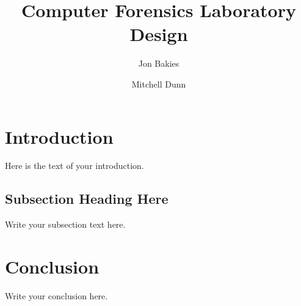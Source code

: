 \documentclass{article}
\begin{document}
\title{Computer Forensics Laboratory Design}
\author{Jon Bakies \and Mitchell Dunn} 

\maketitle
\newpage

\tableofcontents
\newpage

\section{Introduction}
Here is the text of your introduction.

\subsection{Subsection Heading Here}
Write your subsection text here.

\section{Conclusion}
Write your conclusion here.
\end{document}
